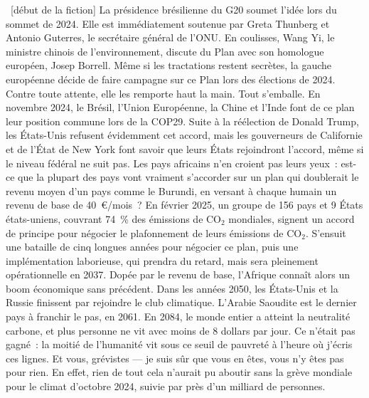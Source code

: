 \documentclass[a5paper,french,openany]{memoir}
\begin{document}
~[début de la fiction] La présidence brésilienne du G20 soumet l'idée lors du sommet de 2024. Elle est immédiatement soutenue par Greta Thunberg et Antonio Guterres, le secrétaire général de l'ONU. 
En coulisses, Wang Yi, le ministre chinois de l'environnement, discute du Plan avec son homologue européen, Josep Borrell. 
Même si les tractations restent secrètes, la gauche européenne décide de faire campagne sur ce Plan lors des élections de 2024. Contre toute attente, elle les remporte haut la main. Tout s'emballe. En novembre 2024, le Brésil, l'Union Européenne, la Chine et l'Inde font de ce plan leur position commune lors de la COP29. Suite à la réélection de Donald Trump, les États-Unis refusent évidemment cet accord, mais les gouverneurs de Californie et de l'État de New York font savoir que leurs États rejoindront l'accord, même si le niveau fédéral ne suit pas. Les pays africains n'en croient pas leurs yeux~: est-ce que la plupart des pays vont vraiment s'accorder sur un plan qui doublerait le revenu moyen d'un pays comme le Burundi, en versant à chaque humain un revenu de base de 40~\euro{}/mois~? En février 2025, un groupe de 156 pays et 9 États états-uniens, couvrant 74~\% des émissions de CO$_\text{2}$ mondiales, signent un accord de principe pour négocier le plafonnement de leurs émissions de CO$_\text{2}$. S'ensuit une bataille de cinq longues années pour négocier ce plan, puis une implémentation laborieuse, qui prendra du retard, mais sera pleinement opérationnelle en 2037. Dopée par le revenu de base, l'Afrique connaît alors un boom économique sans précédent. Dans les années 2050, les États-Unis et la Russie finissent par rejoindre le club climatique. L'Arabie Saoudite est le dernier pays à franchir le pas, en 2061. En 2084, le monde entier a atteint la neutralité carbone, et plus personne ne vit avec moins de 8 dollars par jour. Ce n'était pas gagné~: la moitié de l'humanité vit sous ce seuil de pauvreté à l'heure où j'écris ces lignes. %
Et vous, grévistes --- je suis sûr que vous en êtes, vous n'y êtes pas pour rien. En effet, rien de tout cela n'aurait pu aboutir sans la grève mondiale pour le climat d'octobre 2024, suivie par près d'un milliard de personnes.

\end{document}
